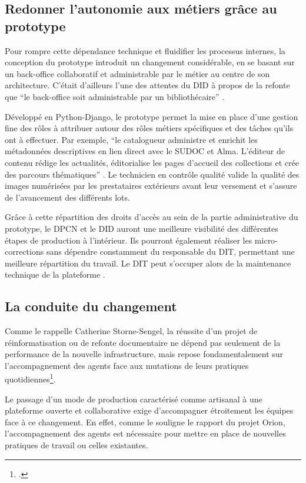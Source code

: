 \subsection{Redonner l'autonomie aux métiers grâce au prototype}
Pour rompre cette dépendance technique et fluidifier les processus internes, la conception du prototype introduit un changement considérable, en se basant sur un back-office collaboratif et administrable par le métier au centre de son architecture. C'était d'ailleurs l'une des attentes du \ac{DID} à propos de la refonte que \enquote{le back-office soit administrable par un bibliothécaire} .

Développé en Python-Django, le prototype permet la mise en place d'une gestion fine des rôles à attribuer autour des rôles métiers spécifiques et des tâches qu'ils ont à effectuer. Par exemple, \enquote{le catalogueur administre et enrichit les métadonnées descriptives en lien direct avec le \ac{SUDOC} et Alma. L'éditeur de contenu rédige les actualités, éditorialise les pages d'accueil des collections et crée des parcours thématiques} . Le technicien en contrôle qualité valide la qualité des images numérisées par les prestataires extérieurs avant leur versement et s'assure de l'avancement des différents lots.

Grâce à cette répartition des droits d'accès au sein de la partie administrative du prototype, le \ac{DPCN} et le \ac{DID} auront une meilleure visibilité des différentes étapes de production à l'intérieur. Ils pourront également réaliser les micro-corrections sans dépendre constamment du responsable du \ac{DIT}, permettant une meilleure répartition du travail. Le \ac{DIT} peut s'occuper alors de la maintenance technique de la plateforme .

\subsection{La conduite du changement}
Comme le rappelle Catherine Storne-Sengel, la réussite d'un projet de réinformatisation ou de refonte documentaire ne dépend pas seulement de la performance de la nouvelle infrastructure, mais repose fondamentalement sur l'accompagnement des agents face aux mutations de leurs pratiques quotidiennes\footcite{storne-sengelAccompagnerChangementsPratique2017}.

Le passage d'un mode de production caractérisé comme artisanal à une plateforme ouverte et collaborative exige d'accompagner étroitement les équipes face à ce changement. En effet, comme le souligne le rapport du projet Orion, l'accompagnement des agents est nécessaire pour mettre en place de nouvelles pratiques de travail ou celles existantes.

